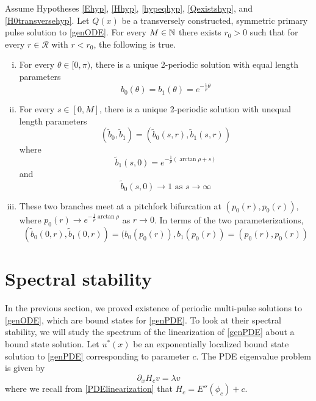 \documentclass[thesis.tex]{subfiles}
\begin{document}
\begin{theorem}\label{2pulsebifurcation}
Assume Hypotheses \ref{Ehyp}, \ref{Hhyp}, \ref{hypeqhyp}, \ref{Qexistshyp}, and \ref{H0transversehyp}. Let $Q(x)$ be a transversely constructed, symmetric primary pulse solution to \eqref{genODE}. For every $M \in {\mathbb N}$ there exists $r_0 > 0$ such that for every $r \in \mathcal{R}$ with $r < r_0$, the following is true.
\begin{enumerate}[(i)]
	\item For every $\theta \in [0, \pi)$, there is a unique 2-periodic solution with equal length parameters 
	\[
	b_0(\theta) = b_1(\theta) = e^{-\frac{1}{\rho}\theta}
	\]
	\item For every $s \in [0, M]$, there is a unique 2-periodic solution with unequal length parameters
	\[
	(\tilde{b}_0, \tilde{b}_1) = (\tilde{b}_0(s, r), \tilde{b}_1(s, r))
	\]
	where
	\[
	\tilde{b}_1(s, 0) = e^{-\frac{1}{\rho}(\arctan \rho + s)}
	\]
	and
	\[
	\tilde{b}_0(s, 0) \rightarrow 1 \text{ as } s \rightarrow \infty
	\]
	\item These two branches meet at a pitchfork bifurcation at $(p_0(r), p_0(r))$, where $p_0(r) \rightarrow e^{-\frac{1}{\rho}\arctan \rho}$ as $r \rightarrow 0$. In terms of the two parameterizations,
	\[
	(\tilde{b}_0(0, r), \tilde{b}_1(0, r)) = (b_0(p_0(r)), b_1(p_0(r)) 
	= (p_0(r), p_0(r))
	\]
\end{enumerate}
\end{theorem}

\section{Spectral stability}

In the previous section, we proved existence of periodic multi-pulse solutions to \eqref{genODE}, which are bound states  for \eqref{genPDE}. To look at their spectral stability, we will study the spectrum of the linearization of \eqref{genPDE} about a bound state solution. Let $u^*(x)$ be an exponentially localized bound state solution to \eqref{genPDE} corresponding to parameter $c$. The PDE eigenvalue problem is given by 
\begin{equation}\label{PDEeig}
\partial_x H_c v = \lambda v
\end{equation}
where we recall from \eqref{PDElinearization} that $H_c = E''(\phi_c) + c$.
\end{document}
